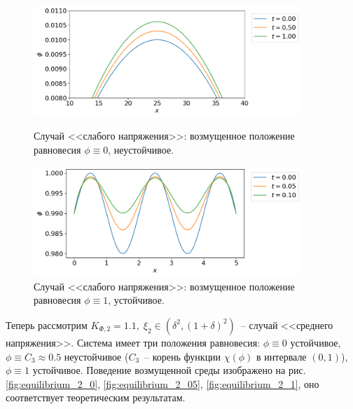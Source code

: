 \begin{figure}[!t]
	\centering
	\includegraphics[width=0.9\textwidth]{figures/equilibrium_1_0.png}
	\vspace{-0.3cm}
	\caption{Случай <<слабого напряжения>>: возмущенное положение равновесия $\phi \equiv 0$, неустойчивое.}
	\label{fig:equilibrium_1_0}
	\vspace{0.5cm}
	
	\includegraphics[width=0.9\textwidth]{figures/equilibrium_1_1.png}
	\vspace{-0.3cm}
	\caption{Случай <<слабого напряжения>>: возмущенное положение равновесия $\phi \equiv 1$, устойчивое.}
	\label{fig:equilibrium_1_1}
\end{figure}

Теперь рассмотрим $K_{\Phi, 2} = 1.1, \; \xi_2 \in (\delta^2, (1 + \delta)^2)$~-- случай <<среднего напряжения>>. Система имеет три положения равновесия: $\phi \equiv 0$ устойчивое, $\phi \equiv C_3 \approx 0.5$ неустойчивое ($C_3$~-- корень функции $\chi(\phi)$ в интервале $(0, 1)$), $\phi \equiv 1$ устойчивое. Поведение возмущенной среды изображено на \linebreak рис. \ref{fig:equilibrium_2_0}, \ref{fig:equilibrium_2_05}, \ref{fig:equilibrium_2_1}, оно соответствует теоретическим результатам.

